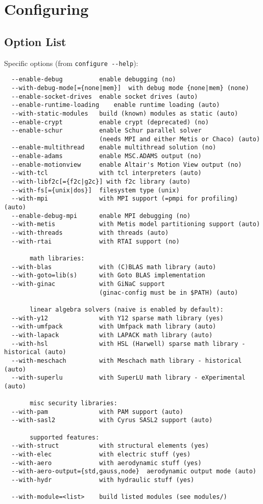 \documentclass[10pt,dvips]{report}
\newcommand{\kw}[1]{\texttt{#1}}
\begin{document}
\section{Configuring}

\subsection{Option List}
Specific options (from \kw{configure -{}-help}):
{\small
\begin{verbatim}
  --enable-debug          enable debugging (no)
  --with-debug-mode[={none|mem}]  with debug mode {none|mem} (none)
  --enable-socket-drives  enable socket drives (auto)
  --enable-runtime-loading    enable runtime loading (auto)
  --with-static-modules   build (known) modules as static (auto)
  --enable-crypt          enable crypt (deprecated) (no)
  --enable-schur          enable Schur parallel solver
                          (needs MPI and either Metis or Chaco) (auto)
  --enable-multithread    enable multithread solution (no)
  --enable-adams          enable MSC.ADAMS output (no)
  --enable-motionview     enable Altair's Motion View output (no)
  --with-tcl              with tcl interpreters (auto)
  --with-libf2c[={f2c|g2c}] with f2c library (auto)
  --with-fs[={unix|dos}]  filesystem type (unix)
  --with-mpi              with MPI support (=pmpi for profiling) (auto)
  --enable-debug-mpi      enable MPI debugging (no)
  --with-metis            with Metis model partitioning support (auto)
  --with-threads          with threads (auto)
  --with-rtai             with RTAI support (no)

       math libraries:
  --with-blas             with (C)BLAS math library (auto)
  --with-goto=lib(s)      with Goto BLAS implementation
  --with-ginac            with GiNaC support
                          (ginac-config must be in $PATH) (auto)

       linear algebra solvers (naive is enabled by default):
  --with-y12              with Y12 sparse math library (yes)
  --with-umfpack          with Umfpack math library (auto)
  --with-lapack           with LAPACK math library (auto)
  --with-hsl              with HSL (Harwell) sparse math library - historical (auto)
  --with-meschach         with Meschach math library - historical (auto)
  --with-superlu          with SuperLU math library - eXperimental (auto)

       misc security libraries:
  --with-pam              with PAM support (auto)
  --with-sasl2            with Cyrus SASL2 support (auto)

       supported features:
  --with-struct           with structural elements (yes)
  --with-elec             with electric stuff (yes)
  --with-aero             with aerodynamic stuff (yes)
  --with-aero-output={std,gauss,node}  aerodynamic output mode (auto)
  --with-hydr             with hydraulic stuff (yes)

  --with-module=<list>    build listed modules (see modules/)
\end{verbatim}
}
\end{document}
